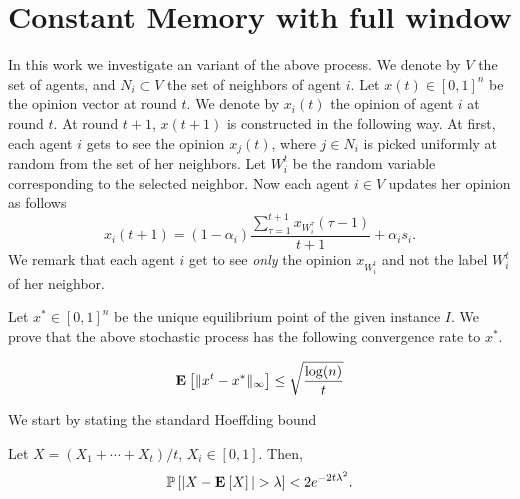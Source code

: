 \section{Constant Memory with full window}

In this work we investigate an variant of the above process.
We denote by $V$ the set of agents, and $N_{i} \subset V$ the set of neighbors
of agent $i$.
Let $x(t) \in [0,1]^n$ be the opinion vector at round $t$.
We denote by $x_i(t)$ the opinion of agent $i$ at round $t$.
At round $t+1$, $x(t+1)$ is constructed in the following way.
At first, each agent $i$ gets to see
the opinion $x_j(t)$, where $j \in N_i$ is picked uniformly at random
from the set of her neighbors.  Let $W_i^t$ be the random variable
corresponding to the selected neighbor. Now each agent $i \in V$
updates her opinion as follows
\[
  x_i(t+1) =
  (1-\alpha_i)\frac{\sum_{\tau=1}^{t+1} x_{W_i^\tau}(\tau-1)}{t+1}
  + \alpha_i s_i.
\]
We remark that each agent $i$ get to see \emph{only} the opinion
$x_{W_i^t}$ and not the label $W_i^t$ of her neighbor.

Let $x^* \in [0,1]^n$ be the unique equilibrium point
of the given instance $I$. We prove that
the above stochastic process has the following convergence
rate to $x^*$.
\begin{theorem}
  \[
    \Exp{\norm{\infty}{x^t - x^*}} \leq \sqrt{\frac{\log(n)}{t}}
  \]
\end{theorem}

We start by stating the standard Hoeffding bound

\begin{lemma}\label{l:hoeffding}
  Let $X = (X_1 +\cdots + X_t) /t$, $X_i \in [0,1]$.
  Then,
  \[
    \Prob{|X - \Exp{X} | > \lambda} < 2 e^{-2 t \lambda^2}.
  \]
\end{lemma}

